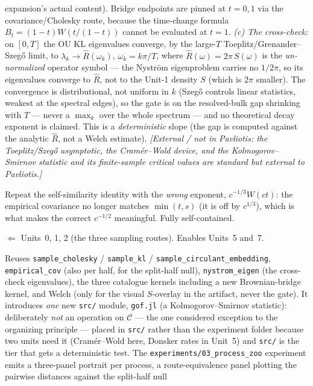 \documentclass[11pt]{article}
\newcommand{\extnote}[1]{{\small\color{extgray}\emph{[External / not in Pavliotis: #1]}}}
\newenvironment{brief}{%
  \begin{description}[style=sameline,leftmargin=2.3cm,font=\bfseries\color{hubblue}]
}{%
  \end{description}
}
\begin{document}
\begin{brief}
expansion's actual content). Bridge endpoints are pinned at $t=0,1$ via the covariance/Cholesky route,
because the time-change formula $B_t=(1-t)W(t/(1-t))$ cannot be evaluated at $t=1$. \emph{(c) The
cross-check:} on $[0,T]$ the OU KL eigenvalues converge, by the large-$T$ Toeplitz/Grenander--Szeg\H{o}
limit, to $\lambda_k\to\hat R(\omega_k)$, $\omega_k=k\pi/T$, where $\hat R(\omega)=2\pi\,S(\omega)$ is
the \emph{un-normalized} operator symbol --- the Nystr\"om eigenproblem carries no $1/2\pi$, so its
eigenvalues converge to $\hat R$, not to the Unit-1 density $S$ (which is $2\pi$ smaller). The
convergence is distributional, not uniform in $k$ (Szeg\H{o} controls linear statistics, weakest at
the spectral edges), so the gate is on the resolved-bulk gap shrinking with $T$ --- never a $\max_k$
over the whole spectrum --- and no theoretical decay exponent is claimed. This is a \emph{deterministic}
slope (the gap is computed against the analytic $\hat R$, not a Welch estimate). \extnote{the
Toeplitz/Szeg\H{o} asymptotic, the Cram\'er--Wold device, and the Kolmogorov--Smirnov statistic and its
finite-sample critical values are standard but external to Pavliotis.}
\item[Falsifier] Repeat the self-similarity identity with the \emph{wrong} exponent,
$c^{-1/3}W(ct)$: the empirical covariance no longer matches $\min(t,s)$ (it is off by $c^{1/3}$),
which is what makes the correct $c^{-1/2}$ meaningful. Fully self-contained.
\item[Depends on / enables] $\Leftarrow$ Units~0, 1, 2 (the three sampling routes). Enables Units~5
and~7.
\item[Deliverable shape] Reuses \texttt{sample\_cholesky} / \texttt{sample\_kl} /
\texttt{sample\_circulant\_embedding}, \texttt{empirical\_cov} (also per half, for the split-half
null), \texttt{nystrom\_eigen} (the cross-check eigenvalues), the three catalogue kernels including a
new Brownian-bridge kernel, and Welch (only for the visual $S$-overlay in the artifact, never the
gate). It introduces \emph{one} new \texttt{src/} module, \texttt{gof.jl} (a Kolmogorov--Smirnov
statistic): deliberately \emph{not} an operation on $\mathcal{C}$ --- the one considered exception to
the organizing principle --- placed in \texttt{src/} rather than the experiment folder because two
units need it (Cram\'er--Wold here, Donsker rates in Unit~5) and \texttt{src/} is the tier that gets a
deterministic test. The \texttt{experiments/03\_process\_zoo} experiment emits a three-panel portrait
per process, a route-equivalence panel plotting the pairwise distances against the split-half null

\end{brief}
\end{document}
